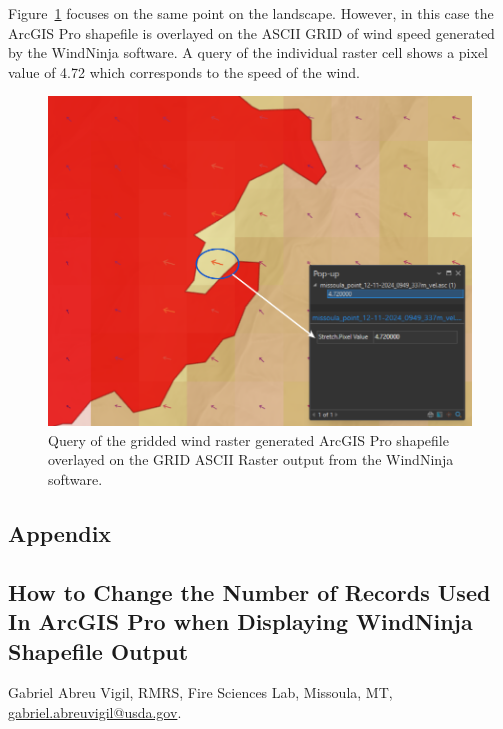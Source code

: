 \documentclass[12pt]{article}
\begin{document}
\newpage

Figure~\ref{fig:Figure15} focuses on the same point on the landscape. However, in this case the ArcGIS Pro shapefile is
overlayed on the ASCII GRID of wind speed generated by the WindNinja software. A query of the individual
raster cell shows a pixel value of 4.72 which corresponds to the speed of the wind.
\begin{figure}[H]
	\centering
	\includegraphics[scale=0.4]{arc_15.png}
	\caption{Query of the gridded wind raster generated ArcGIS Pro shapefile overlayed on the GRID ASCII Raster output from the WindNinja software.}
\label{fig:Figure15}
\end{figure}


\renewcommand{\thefigure}{\arabic{figure}}
\setcounter{figure}{0}

\pagebreak
\begin{centering}
\section*{Appendix}
\label{section:appendix}

\subsection*{How to Change the Number of Records Used In ArcGIS Pro when Displaying WindNinja Shapefile Output}
Gabriel Abreu Vigil, RMRS, Fire Sciences Lab, Missoula, MT, \href{mailto:gabriel.abreuvigil@usda.gov}{gabriel.abreuvigil@usda.gov}.
\end{centering}
\end{document}
